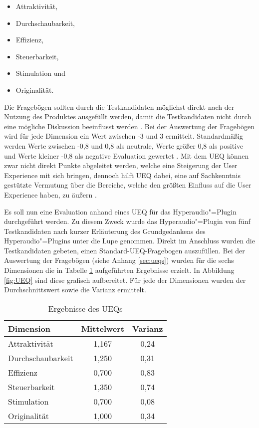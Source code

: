 \begin{itemize}
\item Attraktivität,
\item Durchschaubarkeit,
\item Effizienz,
\item Steuerbarkeit,
\item Stimulation und
\item Originalität.
\end{itemize}

Die Fragebögen sollten durch die Testkandidaten möglichst direkt nach der Nutzung des Produktes ausgefüllt werden, damit die Testkandidaten nicht durch eine mögliche Diskussion beeinflusst werden \citep{schrepp2018user}. Bei der Auswertung der Fragebögen wird für jede Dimension ein Wert zwischen -3 und 3 ermittelt. Standardmäßig werden Werte zwischen -0,8 und 0,8 als neutrale, Werte größer 0,8 als positive und Werte kleiner -0,8 als negative Evaluation gewertet \citep{schrepp2018user}. Mit dem UEQ können zwar nicht direkt Punkte abgeleitet werden, welche eine Steigerung der User Experience mit sich bringen, dennoch hilft UEQ dabei, eine auf Sachkenntnis gestützte Vermutung über die Bereiche, welche den größten Einfluss auf die User Experience haben, zu äußern \citep{schrepp2018user}.

Es soll nun eine Evaluation anhand eines UEQ für das Hyperaudio"=Plugin durchgeführt werden. Zu diesem Zweck wurde das Hyperaudio"=Plugin von fünf Testkandidaten nach kurzer Erläuterung des Grundgedankens des Hyperaudio"=Plugins unter die Lupe genommen. Direkt im Anschluss wurden die Testkandidaten gebeten, einen Standard-UEQ-Fragebogen auszufüllen. Bei der Auswertung der Fragebögen (siehe Anhang \ref{sec:ueqs}) wurden für die sechs Dimensionen die in Tabelle \ref{tab:EvalUEQ} aufgeführten Ergebnisse erzielt. In Abbildung \ref{fig:UEQ} sind diese grafisch aufbereitet. Für jede der Dimensionen wurden der Durchschnittswert sowie die Varianz ermittelt.

\begin{table}[!ht]
\def\arraystretch{1.4}
\begin{tabularx}{\textwidth}{lcc}      
    \hline
    Dimension & Mittelwert & Varianz
    \\\hline
	Attraktivität & 1,167 & 0,24\\
	Durchschaubarkeit & 1,250 & 0,31\\
	Effizienz & 0,700 & 0,83\\
	Steuerbarkeit & 1,350 & 0,74\\
	Stimulation & 0,700 & 0,08\\
	Originalität & 1,000 & 0,34\\
    \hline
    \end{tabularx}
    \caption{Ergebnisse des UEQs}
\label{tab:EvalUEQ}
\end{table}

